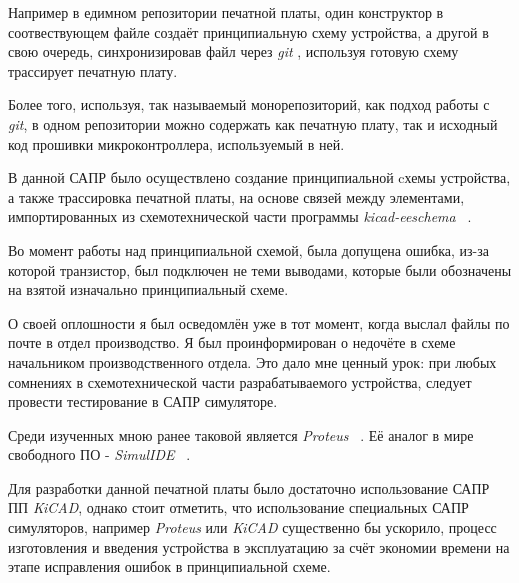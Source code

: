 Например в едимном репозитории печатной платы,
один конструктор в соотвествующем файле
создаёт принципиальную схему устройства,
а другой в свою очередь, синхронизировав файл
через \textit{git} , используя готовую схему
трассирует печатную плату.

Более того, используя, так называемый монорепозиторий, как подход работы с \textit{git},
в одном репозитории можно содержать как печатную плату,
так и исходный код прошивки микроконтроллера,
используемый в ней.

В данной САПР было осуществлено создание
принципиальной cхемы устройства,
а также трассировка печатной платы, на основе связей между элементами,
импортированных из схемотехнической
части программы \textit{kicad-eeschema} ~\cite{kicad-doc-eeschema}.


Во момент работы над принципиальной схемой, была
допущена ошибка, из-за которой транзистор,
был подключен не теми выводами,
которые были обозначены на взятой изначально принципиальный схеме.

О своей оплошности я был осведомлён уже в тот момент,
когда выслал файлы по почте в отдел производство.
Я был проинформирован о недочёте в схеме начальником производственного отдела.
Это дало мне ценный урок:
при любых сомнениях в схемотехнической части разрабатываемого устройства,
следует провести тестирование в САПР симуляторе.

Среди изученных мною ранее
таковой является \textit{Proteus} ~\cite{Proteus-Simulation}. Её аналог в мире свободного ПО - \textit{SimulIDE} ~\cite{SimulIDE}.
%


Для разработки данной печатной платы было достаточно
использование САПР ПП \textit{KiCAD},
однако стоит отметить, что использование специальных САПР симуляторов,
например \textit{Proteus} или \textit{KiCAD} существенно бы ускорило,
процесс изготовления и введения устройства в эксплуатацию
за счёт экономии времени на этапе исправления ошибок в принципиальной схеме.

\newpage

